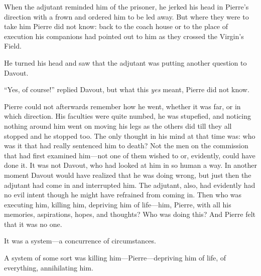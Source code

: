 When the adjutant reminded him of the prisoner, he jerked his
head in Pierre's direction with a frown and ordered him to be led
away. But where they were to take him Pierre did not know: back
to the coach house or to the place of execution his companions
had pointed out to him as they crossed the Virgin's Field.

He turned his head and saw that the adjutant was putting another
question to Davout.

``Yes, of course!'' replied Davout, but what this \emph{yes}
meant, Pierre did not know.

Pierre could not afterwards remember how he went, whether it was
far, or in which direction. His faculties were quite numbed, he
was stupefied, and noticing nothing around him went on moving his
legs as the others did till they all stopped and he stopped
too. The only thought in his mind at that time was: who was it
that had really sentenced him to death? Not the men on the
commission that had first examined him---not one of them wished
to or, evidently, could have done it. It was not Davout, who had
looked at him in so human a way. In another moment Davout would
have realized that he was doing wrong, but just then the adjutant
had come in and interrupted him. The adjutant, also, had
evidently had no evil intent though he might have refrained from
coming in. Then who was executing him, killing him, depriving him
of life---him, Pierre, with all his memories, aspirations, hopes,
and thoughts? Who was doing this? And Pierre felt that it was no
one.

It was a system---a concurrence of circumstances.

A system of some sort was killing him---Pierre---depriving him of
life, of everything, annihilating him.


